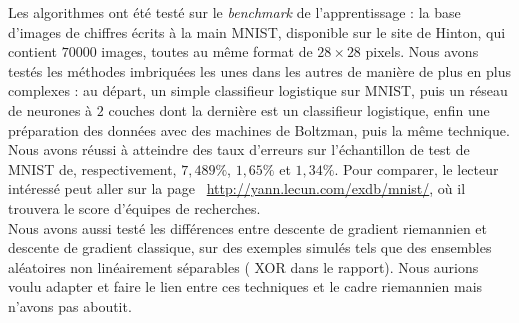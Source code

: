 \documentclass{article}
\begin{document}
Les algorithmes ont été testé sur le \textit{benchmark} de l'apprentissage : la base d'images de chiffres écrits à la main MNIST, disponible sur le site de Hinton, qui contient $70 000$ images, toutes au même format de $28\times 28$ pixels. Nous avons testés les méthodes imbriquées les unes dans les autres de manière de plus en plus complexes : au départ, un simple classifieur logistique sur MNIST, puis un réseau de neurones à $2$ couches dont la dernière est un classifieur logistique, enfin une préparation des données avec des machines de Boltzman, puis la même technique. Nous avons réussi à atteindre des taux d'erreurs sur l'échantillon de test de MNIST de, respectivement, $7,489\%$, $1,65\%$ et $1,34\%$. Pour comparer, le lecteur intéressé peut aller sur la page ~\url{http://yann.lecun.com/exdb/mnist/}, où il trouvera le score d'équipes de recherches. \\

Nous avons aussi testé les différences entre descente de gradient riemannien et descente de gradient classique, sur des exemples simulés tels que des ensembles aléatoires non linéairement séparables ( XOR dans le rapport). Nous aurions voulu adapter et faire le lien entre ces techniques et le cadre riemannien mais n'avons pas aboutit. \\




 
\nocite{*}
\end{document}

